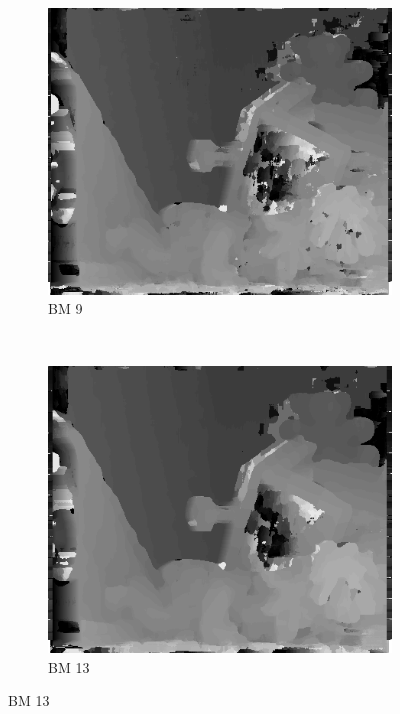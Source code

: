 \begin{figure}

  \begin{subfigure}[b]{0.23\textwidth}
    \centering
    \includegraphics[width=\textwidth]{images/stereo-pairs/teddy_bm_9.png}
    \caption{BM 9}
  \end{subfigure}
  ~
  \begin{subfigure}[b]{0.23\textwidth}
    \centering
    \includegraphics[width=\textwidth]{images/stereo-pairs/teddy_bm_13.png}
    \caption{BM 13}
  \end{subfigure}

\end{figure}
